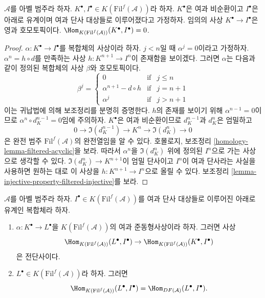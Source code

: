 \begin{lemma}
\label{lemma-filtered-acyclic-is-zero}
$\mathcal{A}$를 아벨 범주라 하자.
$K^\bullet, I^\bullet \in K(\text{Fil}^f(\mathcal{A}))$라 하자.
$K^\bullet$은 여과 비순환이고 $I^\bullet$은 아래로 유계이며 여과 단사
대상들로 이루어졌다고 가정하자. 임의의 사상
$K^\bullet \to I^\bullet$은 영과 호모토픽이다.
$\Hom_{K(\text{Fil}^f(\mathcal{A}))}(K^\bullet, I^\bullet) = 0$.
\end{lemma}

\begin{proof}
$\alpha : K^\bullet \to I^\bullet$를 복합체의 사상이라 하자.
$j < n$일 때 $\alpha^j = 0$이라고 가정하자.
$\alpha^n = h \circ d$를 만족하는 사상 $h : K^{n + 1} \to I^n$이
존재함을 보이겠다. 그러면 $\alpha$는 다음과 같이 정의된 복합체의
사상 $\beta$와 호모토픽이다.
$$
\beta^j =
\left\{
\begin{matrix}
0 & \text{if} & j \leq n \\
\alpha^{n + 1} - d \circ h & \text{if} & j = n + 1 \\
\alpha^j & \text{if} & j > n + 1
\end{matrix}
\right.
$$
이는 귀납법에 의해 보조정리를 분명히 증명한다. $h$의 존재를 보이기
위해 $\alpha^{n - 1} = 0$이므로
$\alpha^n \circ d_K^{n - 1} = 0$임에 주의하자. $K^\bullet$은 여과
비순환이므로 $d_K^{n - 1}$과 $d_K^n$은 엄밀하고
$$
0 \to \Im(d_K^{n - 1}) \to K^n \to \Im(d_K^n) \to 0
$$
은 완전 범주 $\text{Fil}^f(\mathcal{A})$의 완전열임을 알 수 있다.
호몰로지, 보조정리 \ref{homology-lemma-filtered-acyclic}을 보라.
따라서 $\alpha^n$을 $\Im(d_K^n)$ 위에 정의된 $I^n$으로 가는
사상으로 생각할 수 있다. $\Im(d_K^n) \to K^{n + 1}$이 엄밀
단사이고 $I^n$이 여과 단사라는 사실을 사용하면 원하는 대로 이
사상을 $h : K^{n + 1} \to I^n$으로 올릴 수 있다. 보조정리
\ref{lemma-injective-property-filtered-injective}를 보라.
\end{proof}

\begin{lemma}
\label{lemma-morphisms-into-filtered-injective-complex}
$\mathcal{A}$를 아벨 범주라 하자. $I^\bullet \in
K(\text{Fil}^f(\mathcal{A}))$를 여과 단사 대상들로 이루어진 아래로
유계인 복합체라 하자.
\begin{enumerate}
\item $\alpha : K^\bullet \to L^\bullet$을
$K(\text{Fil}^f(\mathcal{A}))$의 여과 준동형사상이라 하자. 그러면 사상
$$
\Hom_{K(\text{Fil}^f(\mathcal{A}))}(L^\bullet, I^\bullet)
\to
\Hom_{K(\text{Fil}^f(\mathcal{A}))}(K^\bullet, I^\bullet)
$$
은 전단사이다.
\item $L^\bullet \in K(\text{Fil}^f(\mathcal{A}))$라 하자. 그러면
$$
\Hom_{K(\text{Fil}^f(\mathcal{A}))}(L^\bullet, I^\bullet)
=
\Hom_{DF(\mathcal{A})}(L^\bullet, I^\bullet).
$$
\end{enumerate}
\end{lemma}

